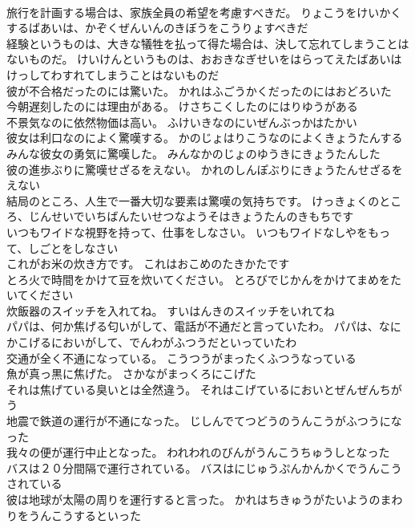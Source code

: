 \documentclass[8pt]{extreport}
\begin{document}
\begin{CJK}{UTF8}{min}
\\	旅行を計画する場合は、家族全員の希望を考慮すべきだ。	りょこうをけいかくするばあいは、かぞくぜんいんのきぼうをこうりょすべきだ 
\\	経験というものは、大きな犠牲を払って得た場合は、決して忘れてしまうことはないものだ。	けいけんというものは、おおきなぎせいをはらってえたばあいはけっしてわすれてしまうことはないものだ 
\\	彼が不合格だったのには驚いた。	かれはふごうかくだったのにはおどろいた 
\\	今朝遅刻したのには理由がある。	けさちこくしたのにはりゆうがある 
\\	不景気なのに依然物価は高い。	ふけいきなのにいぜんぶっかはたかい 
\\	彼女は利口なのによく驚嘆する。	かのじょはりこうなのによくきょうたんする 
\\	みんな彼女の勇気に驚嘆した。	みんなかのじょのゆうきにきょうたんした 
\\	彼の進歩ぶりに驚嘆せざるをえない。	かれのしんぽぶりにきょうたんせざるをえない 
\\	結局のところ、人生で一番大切な要素は驚嘆の気持ちです。	けっきょくのところ、じんせいでいちばんたいせつなようそはきょうたんのきもちです 
\\	いつもワイドな視野を持って、仕事をしなさい。	いつもワイドなしやをもって、しごとをしなさい 
\\	これがお米の炊き方です。	これはおこめのたきかたです 
\\	とろ火で時間をかけて豆を炊いてください。	とろびでじかんをかけてまめをたいてください 
\\	炊飯器のスイッチを入れてね。	すいはんきのスイッチをいれてね 
\\	パパは、何か焦げる匂いがして、電話が不通だと言っていたわ。	パパは、なにかこげるにおいがして、でんわがふつうだといっていたわ 
\\	交通が全く不通になっている。	こうつうがまったくふつうなっている 
\\	魚が真っ黒に焦げた。	さかながまっくろにこげた 
\\	それは焦げている臭いとは全然違う。	それはこげているにおいとぜんぜんちがう 
\\	地震で鉄道の運行が不通になった。	じしんでてつどうのうんこうがふつうになった 
\\	我々の便が運行中止となった。	われわれのびんがうんこうちゅうしとなった 
\\	バスは２０分間隔で運行されている。	バスはにじゅうぷんかんかくでうんこうされている 
\\	彼は地球が太陽の周りを運行すると言った。	かれはちきゅうがたいようのまわりをうんこうするといった 

\end{CJK}
\end{document}

